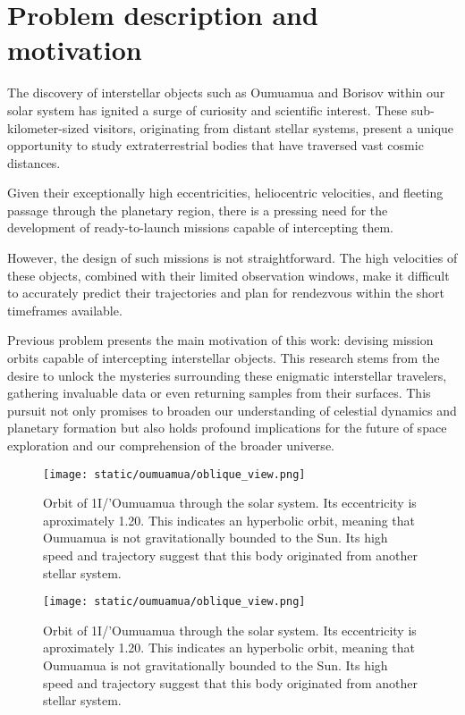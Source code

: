 \section{Problem description and motivation}

The discovery of interstellar objects such as Oumuamua and Borisov within our
solar system has ignited a surge of curiosity and scientific interest. These
sub-kilometer-sized visitors, originating from distant stellar systems, present
a unique opportunity to study extraterrestrial bodies that have traversed vast
cosmic distances. 

Given their exceptionally high eccentricities, heliocentric velocities, and
fleeting passage through the planetary region, there is a pressing need for the
development of ready-to-launch missions capable of intercepting them.

However, the design of such missions is not straightforward. The high velocities
of these objects, combined with their limited observation windows, make it
difficult to accurately predict their trajectories and plan for rendezvous
within the short timeframes available.

Previous problem presents the main motivation of this work: devising mission
orbits capable of intercepting interstellar objects. This research stems from
the desire to unlock the mysteries surrounding these enigmatic interstellar
travelers, gathering invaluable data or even returning samples from their
surfaces. This pursuit not only promises to broaden our understanding of
celestial dynamics and planetary formation but also holds profound implications
for the future of space exploration and our comprehension of the broader
universe.

\begin{figure}[H]
  \centering
  \texttt{[image: static/oumuamua/oblique\_view.png]}
  \caption[Oumuamua orbit through our solar system]{
    Orbit of 1I/'Oumuamua through the solar system. Its eccentricity is
    aproximately 1.20. This indicates an hyperbolic orbit, meaning that
    Oumuamua is not gravitationally bounded to the Sun. Its high speed and
    trajectory suggest that this body originated from another stellar system.
  }
  \label{fig:oumuamua_orbit}
\end{figure}

\begin{figure}[H]
  \centering
  \texttt{[image: static/oumuamua/oblique\_view.png]}
  \caption[Oumuamua orbit through our solar system]{
    Orbit of 1I/'Oumuamua through the solar system. Its eccentricity is
    aproximately 1.20. This indicates an hyperbolic orbit, meaning that
    Oumuamua is not gravitationally bounded to the Sun. Its high speed and
    trajectory suggest that this body originated from another stellar system.
  }
  \label{fig:boriso_orbit}
\end{figure}
